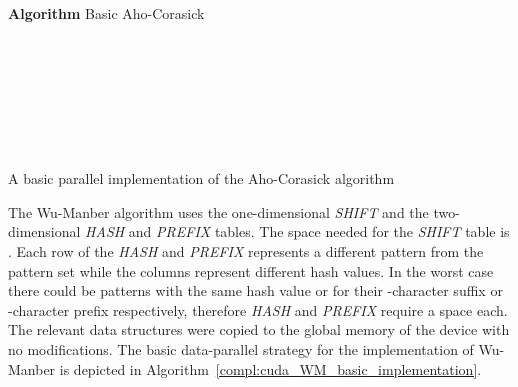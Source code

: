 \documentclass{ws-ijait}
\begin{document}
\begin{algorithm}[h]

\textbf{Algorithm} Basic Aho-Corasick\\

\\
\\
\\


\\

\For{  } {



		\While{  }{
			
			\\
		}
		
		\\
	
		\\
	
}

\caption{A basic parallel implementation of the Aho-Corasick algorithm}
\label{compl:cuda_AC_basic_implementation}
\end{algorithm}
 

The Wu-Manber algorithm uses the one-dimensional \textit{SHIFT} and the two-dimensional \textit{HASH} and \textit{PREFIX} tables. The space needed for the \textit{SHIFT} table is . Each row of the \textit{HASH} and \textit{PREFIX} represents a different pattern from the pattern set while the columns represent different hash values. In the worst case there could be  patterns with the same hash value  or  for their -character suffix or -character prefix respectively, therefore \textit{HASH} and \textit{PREFIX} require a  space each. The relevant data structures were copied to the global memory of the device with no modifications. The basic data-parallel strategy for the implementation of Wu-Manber is depicted in Algorithm~\ref{compl:cuda_WM_basic_implementation}.\\
\end{document}
